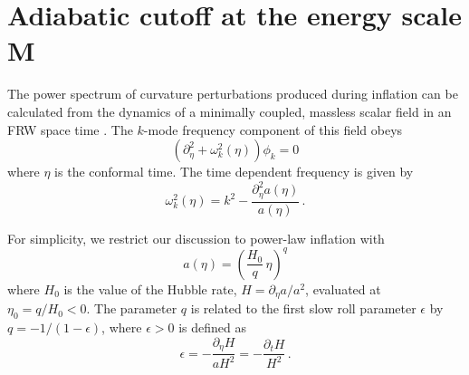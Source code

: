 \documentclass[a4paper,aps,prd,preprint,groupedaddress,nofootinbib]{revtex4}
\begin{document}
\section{Adiabatic cutoff at the energy scale M}

The power spectrum of curvature perturbations produced during
inflation can be calculated from the dynamics of a minimally coupled,
massless scalar field in an FRW space time \cite{MFB92}. The $k$-mode
frequency component of this field obeys 
\begin{equation}
\label{omeg}
(\partial_\eta^2 + \omega^2_k(\eta) ) \phi_k = 0
\end{equation}
where $\eta$ is the conformal time. The time dependent frequency is 
given by
\begin{equation}
\label{omega}
\omega^2_k(\eta) =  k^2 - 
\frac{\partial_\eta^2 a(\eta)}{a(\eta)} \, .
\end{equation}

For simplicity, we restrict our discussion to power-law inflation with
\begin{equation}
a(\eta) = \left(\frac{H_0}{q} \, \eta \right)^q
\end{equation}
where $H_0$ is the value of the Hubble rate, $H = \partial_\eta a/a^2$,
evaluated at $\eta_0 = q/H_0 < 0$.
The parameter $q$ is related to the first slow roll parameter
$\epsilon$ by $q = -1/(1-\epsilon)$, where $\epsilon >0$ is defined as
\begin{equation}
\epsilon = - \frac{\partial_\eta H }{a H^2} = - \frac{\partial_t H }{ H^2}\, .
\end{equation}
\end{document}
